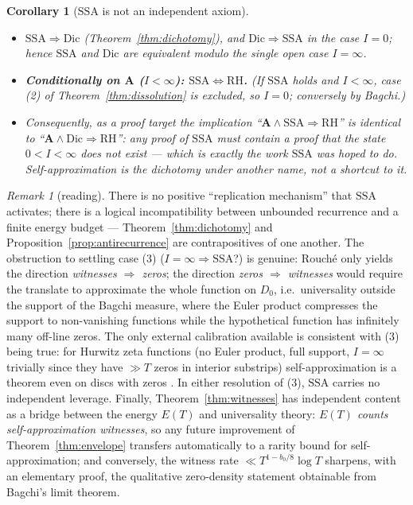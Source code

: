 \documentclass[11pt]{amsart}
\theoremstyle{plain}
\newtheorem{corollary}[theorem]{Corollary}
\theoremstyle{definition}
\theoremstyle{remark}
\newtheorem{remark}[theorem]{Remark}
\newcommand{\RH}{\mathrm{RH}}
\newcommand{\Dic}{\mathrm{Dic}}
\newcommand{\Aax}{\mathbf{A}}
\begin{document}
\begin{corollary}[$\mathrm{SSA}$ is not an independent axiom]\label{cor:notaxiom}
\begin{itemize}
\item[\textup{(1)}] $\mathrm{SSA}\Rightarrow\Dic$ \textup{(}Theorem~\ref{thm:dichotomy}\textup{)}, and $\Dic\Rightarrow\mathrm{SSA}$ in the case $I=0$; hence $\mathrm{SSA}$ and $\Dic$ are equivalent modulo the single open case $I=\infty$.
\item[\textup{(2)}] \textbf{Conditionally on $\Aax$ \textup{(}$I<\infty$\textup{)}: $\mathrm{SSA}\iff\RH$.} \textup{(}If $\mathrm{SSA}$ holds and $I<\infty$, case \textup{(2)} of Theorem~\ref{thm:dissolution} is excluded, so $I=0$; conversely by Bagchi.\textup{)}
\item[\textup{(3)}] Consequently, as a proof target the implication ``$\Aax\wedge\mathrm{SSA}\Rightarrow\RH$'' is identical to ``$\Aax\wedge\Dic\Rightarrow\RH$'': any proof of $\mathrm{SSA}$ must contain a proof that the state $0<I<\infty$ does not exist --- which is exactly the work $\mathrm{SSA}$ was hoped to do. Self-approximation is the dichotomy under another name, not a shortcut to it.
\end{itemize}
\end{corollary}

\begin{remark}[reading]
There is no positive ``replication mechanism'' that $\mathrm{SSA}$ activates; there is a logical incompatibility between unbounded recurrence and a finite energy budget --- Theorem~\ref{thm:dichotomy} and Proposition~\ref{prop:antirecurrence} are contrapositives of one another. The obstruction to settling case (3) ($I=\infty\Rightarrow\mathrm{SSA}$?) is genuine: Rouch\'e only yields the direction \emph{witnesses $\Rightarrow$ zeros}; the direction \emph{zeros $\Rightarrow$ witnesses} would require the translate to approximate the whole function on $D_0$, i.e.\ universality outside the support of the Bagchi measure, where the Euler product compresses the support to non-vanishing functions while the hypothetical function has infinitely many off-line zeros. The only external calibration available is consistent with (3) being true: for Hurwitz zeta functions (no Euler product, full support, $I=\infty$ trivially since they have $\gg T$ zeros in interior substrips) self-approximation is a theorem even on discs with zeros \cite{GarunkstisKarikovas2014}. In either resolution of (3), $\mathrm{SSA}$ carries no independent leverage. Finally, Theorem~\ref{thm:witnesses} has independent content as a bridge between the energy $E(T)$ and universality theory: \emph{$E(T)$ counts self-approximation witnesses}, so any future improvement of Theorem~\ref{thm:envelope} transfers automatically to a rarity bound for self-approximation; and conversely, the witness rate $\ll T^{1-b_0/8}\log T$ sharpens, with an elementary proof, the qualitative zero-density statement obtainable from Bagchi's limit theorem.
\end{remark}
\end{document}
